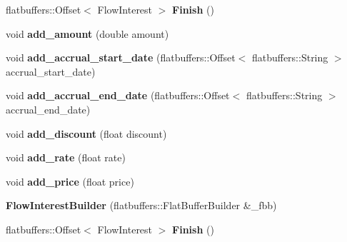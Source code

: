 \begin{DoxyCompactItemize}
flatbuffers\+::\+Offset$<$ Flow\+Interest $>$ {\bfseries Finish} ()
\item 
\mbox{\label{structquantra_1_1FlowInterestBuilder_af7424059a3ce706b6b9aae705e19c1f8}} 
void {\bfseries add\+\_\+amount} (double amount)
\item 
\mbox{\label{structquantra_1_1FlowInterestBuilder_a32c5350de9c05ac7b675d48b8974c9f0}} 
void {\bfseries add\+\_\+accrual\+\_\+start\+\_\+date} (flatbuffers\+::\+Offset$<$ flatbuffers\+::\+String $>$ accrual\+\_\+start\+\_\+date)
\item 
\mbox{\label{structquantra_1_1FlowInterestBuilder_a949f5c0ccf619f7c15e0c6ae6e6acb5b}} 
void {\bfseries add\+\_\+accrual\+\_\+end\+\_\+date} (flatbuffers\+::\+Offset$<$ flatbuffers\+::\+String $>$ accrual\+\_\+end\+\_\+date)
\item 
\mbox{\label{structquantra_1_1FlowInterestBuilder_a1200efd055ba511bdabfbd2d5a9f3e29}} 
void {\bfseries add\+\_\+discount} (float discount)
\item 
\mbox{\label{structquantra_1_1FlowInterestBuilder_a2b35605c938c635d39748ccb58bed5c6}} 
void {\bfseries add\+\_\+rate} (float rate)
\item 
\mbox{\label{structquantra_1_1FlowInterestBuilder_a4ee6a971fb7a04d64b7a5960dedad4df}} 
void {\bfseries add\+\_\+price} (float price)
\item 
\mbox{\label{structquantra_1_1FlowInterestBuilder_a28ec59385c7cf4ba22dcb2244faf6d25}} 
{\bfseries Flow\+Interest\+Builder} (flatbuffers\+::\+Flat\+Buffer\+Builder \&\+\_\+fbb)
\item 
\mbox{\label{structquantra_1_1FlowInterestBuilder_a9f628e0afe32f445bb1b3d5b1738cf9a}} 
flatbuffers\+::\+Offset$<$ Flow\+Interest $>$ {\bfseries Finish} ()
\end{DoxyCompactItemize}
